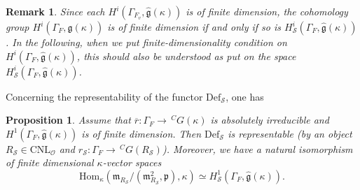 \documentclass[12pt,oneside,reqno]{amsart}
\theoremstyle{plain}
\newtheorem{proposition}[theorem]{Proposition}
\newtheorem{remark}[theorem]{Remark}
\begin{document}
	\begin{remark}\rm 
		Since each
		$H^i(\Gamma_{F_v},
		\widehat{\mathfrak{g}}(\kappa))$
		is of finite dimension,
		the cohomology
		group
		$H^i(\Gamma_F,
		\widehat{\mathfrak{g}}(\kappa))$
		is of finite dimension if and only if so is
		$H^i_{\mathcal{S}}(\Gamma_F,
		\widehat{\mathfrak{g}}(\kappa))$.
		In the following,
		when we put finite-dimensionality condition
		on
		$H^i(\Gamma_F,
		\widehat{\mathfrak{g}}(\kappa))$,
		this should also be understood as
		put on the space
		$H^i_{\mathcal{S}}
		(\Gamma_F,
		\widehat{\mathfrak{g}}(\kappa))$.
	\end{remark}
	
	
	
	Concerning the representability of the functor
	$\mathrm{Def}_\mathcal{S}$,
	one has
	\begin{proposition}
		Assume that
		$\overline{r}
		\colon
		\Gamma_F
		\rightarrow
		\,^CG(\kappa)$
		is absolutely irreducible and
		$H^1(\Gamma_F,
		\widehat{\mathfrak{g}}(\kappa))$
		is of finite dimension.
		Then
		$\mathrm{Def}_\mathcal{S}$
		is representable
		(by an object
		$R_\mathcal{S}\in
		\mathrm{CNL}_\mathcal{O}$
		and
		$r_\mathcal{S}
		\colon
		\Gamma_F
		\rightarrow
		\,^CG(R_\mathcal{S})$).
		Moreover,
		we have a natural isomorphism
		of finite dimensional $\kappa$-vector spaces
		\[
		\mathrm{Hom}_\kappa
		(
		\mathfrak{m}_{R_\mathcal{S}}/
		(\mathfrak{m}_{R_\mathcal{S}}^2,\mathfrak{p}),\kappa
		)
		\simeq
		H^1_{\mathcal{S}}(\Gamma_F,
		\widehat{\mathfrak{g}}(\kappa)).
		\]
	\end{proposition}
\end{document}
